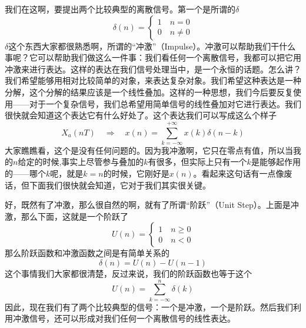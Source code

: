\documentclass[a4paper,12pt]{article}
\begin{document}
我们在这啊，要提出两个比较典型的离散信号。第一个是所谓的$\delta$
\begin{equation}
\delta(n) = 
\left\{\begin{matrix} 
  1\quad n=0 \\  
  0\quad n\neq 0 
\end{matrix}\right. 
\end{equation}
$\delta$这个东西大家都很熟悉啊，所谓的“冲激”（Impulse）。冲激可以帮助我们干什么事呢？它可以帮助我们做这么一件事：我们看任何一个离散信号，我都可以把它用冲激来进行表达。这样的表达在我们信号处理当中，是一个永恒的话题。怎么讲？我们希望能够用相对比较简单的对象，来表达复杂对象。我们希望这种表达是一种分解，这个分解的结果应该是一个线性叠加。这样的一种思想，我们今后要反复使用——对于一个复杂信号，我们总希望用简单信号的线性叠加对它进行表达。我们很快就会知道这个表达它有什么好处了。这个表达我们可以写成这么个样子
\begin{equation}
    X_a(nT)\quad \Longrightarrow \quad x(n)=\sum_{k=-\infty }^{+\infty}x(k)\delta(n-k)
\end{equation}
大家瞧瞧看，这个是没有任何问题的。因为我冲激啊，它只在零点有值，所以当我的$n$给定的时候,事实上尽管参与叠加的$k$有很多，但实际上只有一个$k$是能够起作用的——哪个$k$呢，就是$k=n$的时候，它刚好是$x(n)$。看起来这句话有一点像废话，但下面我们很快就会知道，它对于我们其实很关键。


好，既然有了冲激，那么很自然的啊，就有了所谓“阶跃”（Unit Step）。上面是冲激，那么下面，这就是一个阶跃了
\begin{equation}
U(n) = 
\left\{\begin{matrix} 
  1\quad n \geqslant 0\\  
  0\quad n < 0 
\end{matrix}\right. 
\end{equation}
那么阶跃函数和冲激函数之间是有简单关系的
\begin{equation}
    \delta(n) = U(n) - U(n - 1)
\end{equation}
这个事情我们大家都很清楚，反过来说，我们的阶跃函数也等于这个
\begin{equation}
    U(n) = \sum_{k=-\infty}^n\delta(k)
\end{equation}
因此，现在我们有了两个比较典型的信号：一个是冲激，一个是阶跃。然后我们利用冲激信号，还可以形成对我们任何一个离散信号的线性表达。
\end{document}
